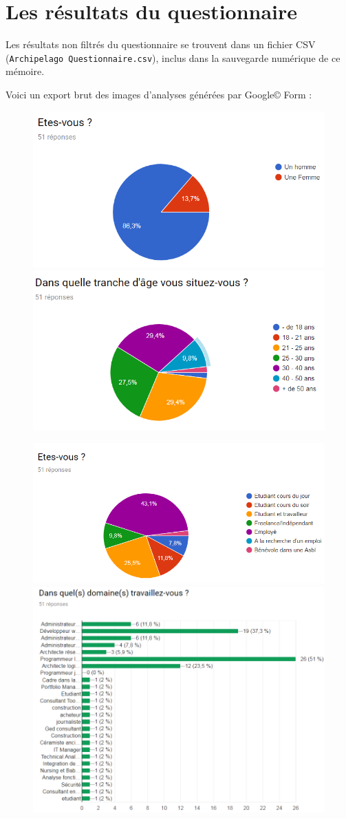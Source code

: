 \documentclass[a4paper,fleqn,12pt,oneside]{report}
\begin{document}
\section*{Les résultats du questionnaire}
Les résultats non filtrés du questionnaire se trouvent dans un fichier CSV (\texttt{Archipelago Questionnaire.csv}), inclus dans la sauvegarde numérique de ce mémoire.

Voici un export brut des images d'analyses générées par Google{\mbox{\scriptsize{\copyright}}} Form :

\begin{figure}[htp]
\centering
    \includegraphics[width=.45\textwidth]{figures/1.png}\quad
    \includegraphics[width=.45\textwidth]{figures/2.png}
\end{figure}
\begin{figure}[htp]
\centering
    \includegraphics[width=.45\textwidth]{figures/3.png}\quad
    \includegraphics[width=.45\textwidth]{figures/4.png}
\end{figure}
\end{document}
